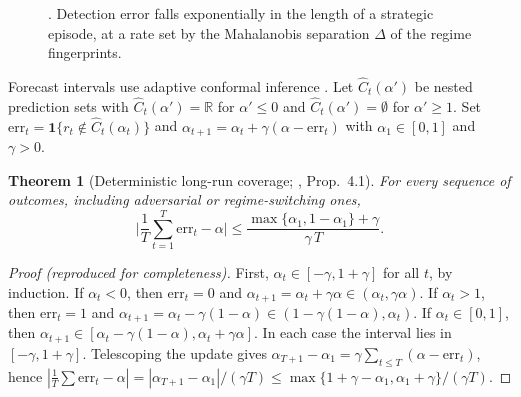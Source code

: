 \documentclass[11pt,a4paper]{article}
\theoremstyle{plain}
\newtheorem{theorem}{Theorem}[section]
\theoremstyle{definition}
\theoremstyle{remark}
\newcommand{\R}{\mathbb{R}}
\newcommand{\ind}{\mathbf{1}}
\begin{document}
\begin{figure}[ht]
\centering
{}
\caption{. Detection error falls exponentially in the length of a strategic episode, at a rate set by the Mahalanobis separation $\Delta$ of the regime fingerprints.}
\label{fig:detect}
\end{figure}

Forecast intervals use adaptive conformal inference \citep{gibbs2021}. Let $\hat C_t(\alpha')$ be nested prediction sets with $\hat C_t(\alpha')=\R$ for $\alpha'\le0$ and $\hat C_t(\alpha')=\emptyset$ for $\alpha'\ge1$. Set $\mathrm{err}_t=\ind\{r_t\notin\hat C_t(\alpha_t)\}$ and $\alpha_{t+1}=\alpha_t+\gamma(\alpha-\mathrm{err}_t)$ with $\alpha_1\in[0,1]$ and $\gamma>0$.

\begin{theorem}[Deterministic long-run coverage; \citealp{gibbs2021}, Prop.~4.1]\label{thm:aci}
For \emph{every} sequence of outcomes, including adversarial or regime-switching ones,
\[
  \Big|\frac1T\sum_{t=1}^T\mathrm{err}_t-\alpha\Big|\le\frac{\max\{\alpha_1,1-\alpha_1\}+\gamma}{\gamma\,T}.
\]
\end{theorem}
\begin{proof}[Proof (reproduced for completeness)]
First, $\alpha_t\in[-\gamma,1+\gamma]$ for all $t$, by induction. If $\alpha_t<0$, then $\mathrm{err}_t=0$ and $\alpha_{t+1}=\alpha_t+\gamma\alpha\in(\alpha_t,\gamma\alpha)$. If $\alpha_t>1$, then $\mathrm{err}_t=1$ and $\alpha_{t+1}=\alpha_t-\gamma(1-\alpha)\in(1-\gamma(1-\alpha),\alpha_t)$. If $\alpha_t\in[0,1]$, then $\alpha_{t+1}\in[\alpha_t-\gamma(1-\alpha),\alpha_t+\gamma\alpha]$. In each case the interval lies in $[-\gamma,1+\gamma]$. Telescoping the update gives $\alpha_{T+1}-\alpha_1=\gamma\sum_{t\le T}(\alpha-\mathrm{err}_t)$, hence $|\frac1T\sum\mathrm{err}_t-\alpha|=|\alpha_{T+1}-\alpha_1|/(\gamma T)\le\max\{1+\gamma-\alpha_1,\alpha_1+\gamma\}/(\gamma T)$.
\end{proof}
\end{document}
